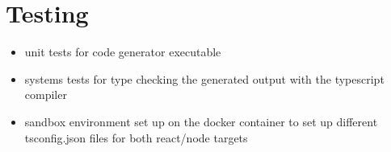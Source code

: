 \section{Testing}
\begin{itemize}
\item unit tests for code generator executable
\item systems tests for type checking the generated output with the typescript compiler
\item sandbox environment set up on the docker container to set up different tsconfig.json files for both react/node targets
\end{itemize}